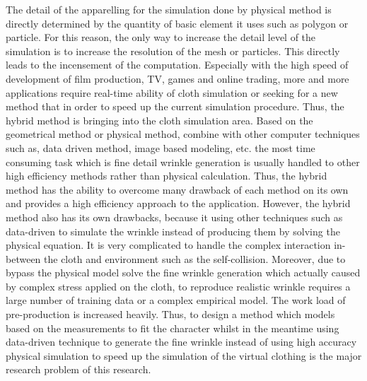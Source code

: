 The detail of the apparelling for the simulation done by physical method is directly determined by the quantity of basic element it uses such as polygon or particle. For this reason, the only way to increase the detail level of the simulation is to increase the resolution of the mesh or particles. This directly leads to the incensement of the computation. Especially with the high speed of development of film production, TV, games and online trading, more and more applications require real-time ability of cloth simulation or seeking for a new method that in order to speed up the current simulation procedure. Thus, the hybrid method is bringing into the cloth simulation area. Based on the geometrical method or physical method, combine with other computer techniques such as, data driven method, image based modeling, etc. the most time consuming task which is fine detail wrinkle generation is usually handled to other high efficiency methods rather than physical calculation. Thus, the hybrid method has the ability to overcome many drawback of each method on its own and provides a high efficiency approach to the application. 
However, the hybrid method also has its own drawbacks, because it using other techniques such as data-driven to simulate the wrinkle instead of producing them by solving the physical equation. It is very complicated to handle the complex interaction in-between the cloth and environment such as the self-collision. Moreover, due to bypass the physical model solve the fine wrinkle generation which actually caused by complex stress applied on the cloth, to reproduce realistic wrinkle requires a large number of training data or a complex empirical model. The work load of pre-production is increased heavily. Thus, to design a method which models based on the measurements to fit the character whilst in the meantime using data-driven technique to generate the fine wrinkle instead of using high accuracy physical simulation to speed up the simulation of the virtual clothing is the major research problem of this research.





\ifx\isEmbedded\undefined


\pagebreak

\fi
